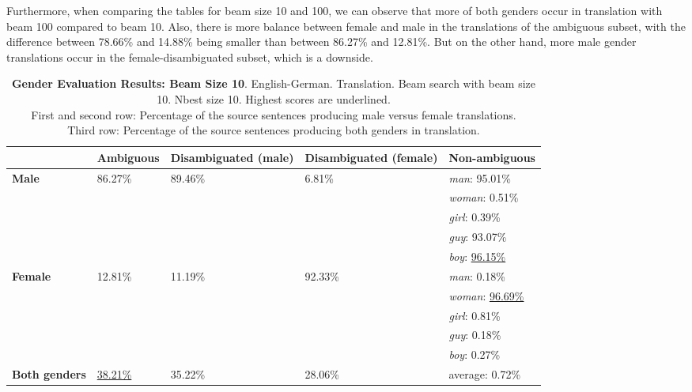 Furthermore, when comparing the tables for beam size 10 and 100, we can observe that more of both genders occur in translation with beam 100 compared to beam 10. Also, there is more balance between female and male in the translations of the ambiguous subset, with the difference between 78.66\% and 14.88\% being smaller than between 86.27\% and 12.81\%. But on the other hand, more male gender translations occur in the female-disambiguated subset, which is a downside.

\begin{table} 
    \label{tab:gender_percent_10}
    \begin{tabularx}{\linewidth}{|X|XXXX|}
        \hline
         & \textbf{Ambiguous} & \textbf{Disambiguated (male)} & \textbf{Disambiguated (female)} & \textbf{Non-ambiguous} \\ \hline
         \textbf{Male} & 86.27\% & 89.46\% & 6.81\% & \textit{man}: 95.01\% \\
         &&&& \textit{woman}: 0.51\% \\
         &&&& \textit{girl}: 0.39\% \\
         &&&& \textit{guy}: 93.07\% \\
         &&&& \textit{boy}: \underline{96.15\%} \\ \hline
         \textbf{Female} & 12.81\% & 11.19\% & 92.33\% & \textit{man}: 0.18\% \\ 
         &&&& \textit{woman}: \underline{96.69\%} \\
         &&&& \textit{girl}: 0.81\% \\
         &&&& \textit{guy}: 0.18\% \\
         &&&& \textit{boy}: 0.27\% \\\hline
         \textbf{Both genders} & \underline{38.21\%} & 35.22\% & 28.06\% & average: 0.72\% \\ \hline
    \end{tabularx}
    \caption{\textbf{Gender Evaluation Results: Beam Size 10}. English-German. Translation. Beam search with beam size 10. Nbest size 10. Highest scores are underlined. \\ First and second row: Percentage of the source sentences producing male versus female translations. \\ Third row: Percentage of the source sentences producing both genders in translation.}
\end{table}

